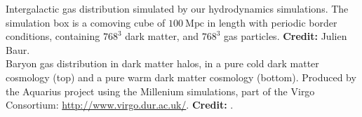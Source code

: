 \vspace{0.2cm}
\hspace{0.6cm}
Intergalactic gas distribution simulated by our hydrodynamics simulations. The simulation box is a comoving cube of $100~\mathrm{Mpc}$ in length with periodic border conditions, containing $768^3$ dark matter, and $768^3$ gas particles. \textbf{Credit:} Julien Baur. \\

\vspace{0.2cm}
\hspace{0.6cm}
Baryon gas distribution in dark matter halos, in a pure cold dark matter cosmology (top) and a pure warm dark matter cosmology (bottom). Produced by the \textsf{Aquarius} project using the \textsf{Millenium} simulations, part of the Virgo Consortium: \url{http://www.virgo.dur.ac.uk/}. \textbf{Credit:} \cite{Lovell_wdm_halo}.
